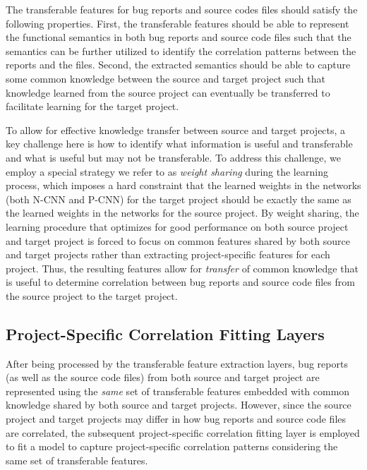 The transferable features for bug reports and source codes files should satisfy the following properties. First, the transferable features should be able to represent the functional semantics in both bug reports and source code files such that the semantics can be further utilized to identify the correlation patterns between the reports and the files. Second, the extracted semantics should be able to capture some common knowledge between the source and target project such that knowledge learned from the source project can eventually be transferred to facilitate learning for the target project.

To allow for effective knowledge transfer between source and target projects, a key challenge here is how to identify what information is useful and transferable and what is useful but may not be transferable. To address this challenge, we employ a special strategy we refer to as \emph{weight sharing} during the learning process, which imposes a hard constraint that the learned weights in the networks (both N-CNN and P-CNN) for the target project should be exactly the same as the learned weights in the networks for the source project. By weight sharing, the learning procedure that optimizes for good performance on both source project and target project is forced to focus on common features shared by both source and target projects rather than extracting project-specific features for each project. Thus, the resulting features allow for \emph{transfer} of common knowledge that is useful to determine correlation between bug reports and source code files from the source project to the target project. 


\subsection{Project-Specific Correlation Fitting Layers}

After being processed by the transferable feature extraction layers, bug reports (as well as the source code files) from both source and target project are represented using the \emph{same} set of transferable features embedded with common knowledge shared by both source and target projects. However, since the source project and target projects may differ in how bug reports and source code files are correlated, the subsequent project-specific correlation fitting layer is employed to fit a model to capture project-specific correlation patterns considering the same set of transferable features.

